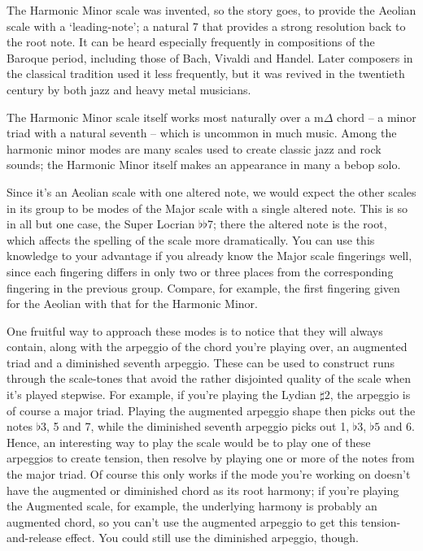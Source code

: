 \documentclass[english]{./gbook}
\begin{document}
\begin{large}
The Harmonic Minor scale was invented, so the story goes, to provide the Aeolian scale with a `leading-note'; a natural 7 that provides a strong resolution back to the root note. It can be heard especially frequently in compositions of the Baroque period, including those of Bach, Vivaldi and Handel. Later composers in the classical tradition used it less frequently, but it was revived in the twentieth century by both jazz and heavy metal musicians. 

The Harmonic Minor scale itself works most naturally over a m$\Delta$ chord -- a minor triad with a natural seventh -- which is uncommon in much music. Among the harmonic minor modes are many scales used to create classic jazz and rock sounds; the Harmonic Minor itself makes an appearance in many a bebop solo. 

Since it's an Aeolian scale with one altered note, we would expect the other scales in its group to be modes of the Major scale with a single altered note. This is so in all but one case, the Super Locrian $\flat\flat$7; there the altered note is the root, which affects the spelling of the scale more dramatically. You can use this knowledge to your advantage if you already know the Major scale fingerings well, since each fingering differs in only two or three places from the corresponding fingering in the previous group. Compare, for example, the first fingering given for the Aeolian with that for the Harmonic Minor. 

One fruitful way to approach these modes is to notice that they will always contain, along with the arpeggio of the chord you're playing over, an augmented triad and a diminished seventh arpeggio. These can be used to construct runs through the scale-tones that avoid the rather disjointed quality of the scale when it's played stepwise. For example, if you're playing the Lydian $\sharp 2$, the arpeggio is of course a major triad. Playing the augmented arpeggio shape then picks out the notes $\flat 3$, 5 and 7, while the diminished seventh arpeggio picks out 1, $\flat 3$, $\flat 5$ and 6. Hence, an interesting way to play the scale would be to play one of these arpeggios to create tension, then resolve by playing one or more of the notes from the major triad. Of course this only works if the mode you're working on doesn't have the augmented or diminished chord as its root harmony; if you're playing the Augmented scale, for example, the underlying harmony is probably an augmented chord, so you can't use the augmented arpeggio to get this tension-and-release effect. You could still use the diminished arpeggio, though.


\end{large}
\end{document}
